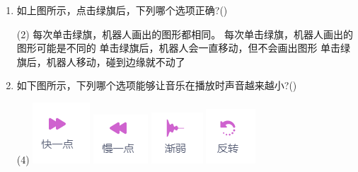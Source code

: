 \documentclass[10pt, a4paper]{article}
\begin{document}
\begin{enumerate}
        \item 如上图所示，点击绿旗后，下列哪个选项正确?(\qquad)
        \begin{tasks}(2)
            \task 每次单击绿旗，机器人画出的图形都相同。
            \task 每次单击绿旗，机器人画出的图形可能是不同的
            \task 单击绿旗后，机器人会一直移动，但不会画出图形
            \task 单击绿旗后，机器人移动，碰到边缘就不动了
        \end{tasks}

        \item 如下图所示，下列哪个选项能够让音乐在播放时声音越来越小?(\qquad)
        \begin{tasks}(4)
            \task \includegraphics[width=.05\textwidth]{15a.png}
            \task \includegraphics[width=.05\textwidth]{15b.png}
            \task \includegraphics[width=.05\textwidth]{15c.png}
            \task \includegraphics[width=.05\textwidth]{15d.png}
        \end{tasks}


\end{enumerate}
\end{document}
